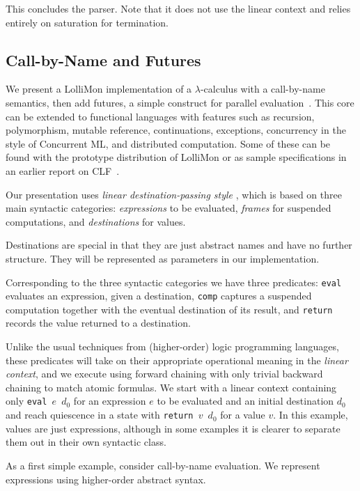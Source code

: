 \documentclass{sig-alt}
\begin{document}
This concludes the parser.  Note that it does
not use the linear context and relies entirely on
saturation for termination.

\subsection{Call-by-Name and Futures}
\label{ssec:mml}

We present a LolliMon implementation of a $\lambda$-calculus with a
call-by-name semantics, then add futures, a simple construct for
parallel evaluation~\cite{Halstead85}.  This core can be extended to
functional languages with features such as recursion, polymorphism,
mutable reference, continuations, exceptions, concurrency in the style
of Concurrent ML, and distributed computation.  Some of these can be
found with the prototype distribution of LolliMon or as sample specifications in
an earlier report on CLF~\cite{Cervesato02tr}.

Our presentation uses \emph{linear des\-ti\-na\-tion-pass\-ing
style} \cite{Pfenning04aplas}, which is based on three main syntactic
categories: \emph{expressions} to be evaluated, \emph{frames} for
suspended computations, and \emph{destinations} for values.

Destinations are special in that they are just
abstract names and have no further structure.  They will
be represented as parameters in our implementation.

Corresponding to the three syntactic categories we have three
predicates: \texttt{eval} evaluates an expression, given a destination,
\texttt{comp} captures a suspended computation together with the
eventual destination of its result, and \texttt{return} records the
value returned to a destination.

Unlike the usual techniques from (higher-order) logic programming
languages, these predicates will take on their appropriate operational
meaning in the \emph{linear context}, and we execute using
forward chaining with only trivial backward chaining to match atomic
formulas.  We start with a linear context containing only
\texttt{eval $e$ $d_0$}
for an expression $e$ to be evaluated and an initial destination $d_0$
and reach quiescence in a state with
\texttt{return $v$ $d_0$}
for a value $v$.  In this example, values are just expressions, although
in some examples it is clearer to separate them out in their own
syntactic class.

As a first simple example, consider call-by-name evaluation.
We represent expressions using higher-order abstract syntax.
\end{document}
